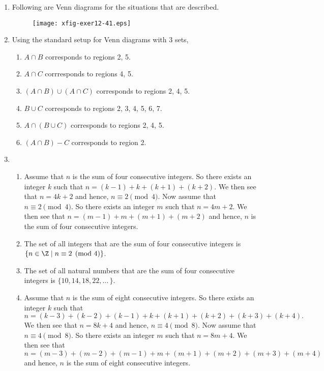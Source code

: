 \begin{enumerate}
\item Following are Venn diagrams for the situations that are described.
\begin{figure}[h]
\begin{center}
\texttt{[image: xfig-exer12-41.eps]}
\end{center}
\end{figure}


\item Using the standard setup for Venn diagrams with 3 sets,
\begin{enumerate}
\item $A \cap B$ corresponds to regions 2, 5.

\item $A \cap C$ corrresponds to regions 4, 5.

\item $(A \cap B) \cup (A \cap C)$ corresponds to regions 2, 4, 5.

\item $B \cup C$ corresponds to regions 2, 3, 4, 5, 6, 7.

\item $A \cap (B \cup C)$ corresponds to regions 2, 4, 5.

\item $(A \cap B) - C$ corresponds to region 2.
\end{enumerate}


\item \begin{enumerate}
\item Assume that $n$ is the sum of four consecutive integers.  So there exists an integer $k$ such that $n = (k - 1) + k + (k + 1) + (k + 2)$.  We then see that $n = 4k + 2$ and hence, 
$n \equiv 2 \pmod 4$.  Now assume that $n \equiv 2 \pmod 4$.  So there exists an integer $m$ such that $n = 4m + 2$.  We then see that $n = (m - 1) + m + (m + 1) + (m + 2)$ and hence, 
$n$ is the sum of four consecutive integers.

\item The set of all integers that are the sum of four consecutive integers is 
$\left\{ n \in \Z \mid n \equiv 2 \pmod 4 \right\}$.

\item The set of all natural numbers that are the sum of four consecutive integers is 
$\{10, 14, 18, 22, \ldots \, \}$.

\item Assume that $n$ is the sum of eight consecutive integers.  So there exists an integer $k$ such that
\[
n = (k - 3) + (k - 2) + (k - 1) + k + (k + 1) + (k + 2) + (k + 3) + (k + 4).
\]
We then see that $n = 8k + 4$ and hence, $n \equiv 4 \pmod 8$.  Now assume that 
$n \equiv 4 \pmod 8$.  So there exists an integer $m$ such that $n = 8m + 4$.  We then see that 
\[
n = (m - 3) + (m - 2) + (m - 1) + m + (m + 1) + (m + 2) + (m + 3) + (m + 4) 
\]
and hence, $n$ is the sum of eight consecutive integers.


\end{enumerate}
\end{enumerate}
